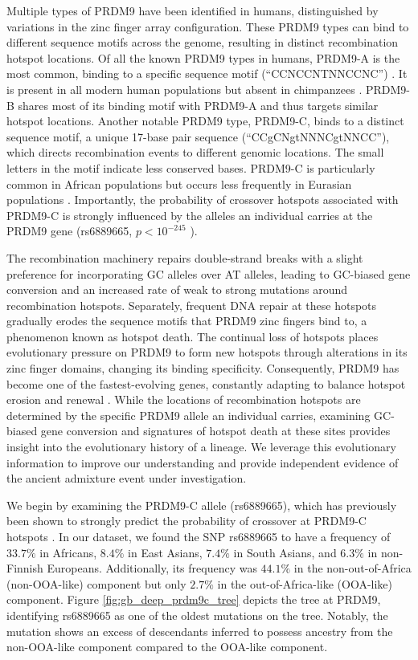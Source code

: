 Multiple types of PRDM9 have been identified in humans, distinguished by variations in the zinc finger array configuration. These PRDM9 types can bind to different sequence motifs across the genome, resulting in distinct recombination hotspot locations. Of all the known PRDM9 types in humans, PRDM9-A is the most common, binding to a specific sequence motif (``CCNCCNTNNCCNC'') \cite{coop2008high,myers2008common}. It is present in all modern human populations but absent in chimpanzees \cite{myers2010drive}. PRDM9-B shares most of its binding motif with PRDM9-A and thus targets similar hotspot locations. Another notable PRDM9 type, PRDM9-C, binds to a distinct sequence motif, a unique 17-base pair sequence (``CCgCNgtNNNCgtNNCC''), which directs recombination events to different genomic locations. The small letters in the motif indicate less conserved bases. PRDM9-C is particularly common in African populations but occurs less frequently in Eurasian populations \cite{hinch2011landscape,wegmann2011recombination,alleva2021cataloging}. Importantly, the probability of crossover hotspots associated with PRDM9-C is strongly influenced by the alleles an individual carries at the PRDM9 gene (rs6889665, $p<10^{-245}$ \cite{hinch2011landscape}). 

The recombination machinery repairs double-strand breaks with a slight preference for incorporating GC alleles over AT alleles, leading to GC-biased gene conversion and an increased rate of weak to strong mutations around recombination hotspots. Separately, frequent DNA repair at these hotspots gradually erodes the sequence motifs that PRDM9 zinc fingers bind to, a phenomenon known as hotspot death. The continual loss of hotspots places evolutionary pressure on PRDM9 to form new hotspots through alterations in its zinc finger domains, changing its binding specificity. Consequently, PRDM9 has become one of the fastest-evolving genes, constantly adapting to balance hotspot erosion and renewal \cite{myers2010drive,baker2017repeated}. While the locations of recombination hotspots are determined by the specific PRDM9 allele an individual carries, examining GC-biased gene conversion and signatures of hotspot death at these sites provides insight into the evolutionary history of a lineage. We leverage this evolutionary information to improve our understanding and provide independent evidence of the ancient admixture event under investigation.

We begin by examining the PRDM9-C allele (rs6889665), which has previously been shown to strongly predict the probability of crossover at PRDM9-C hotspots \cite{hinch2011landscape}. In our dataset, we found the SNP rs6889665 to have a frequency of $33.7\%$ in Africans, $8.4\%$ in East Asians, $7.4\%$ in South Asians, and $6.3\%$ in non-Finnish Europeans. Additionally, its frequency was $44.1\%$ in the non-out-of-Africa (non-OOA-like) component but only $2.7\%$ in the out-of-Africa-like (OOA-like) component. Figure \ref{fig:gb_deep_prdm9c_tree} depicts the tree at PRDM9, identifying rs6889665 as one of the oldest mutations on the tree. Notably, the mutation shows an excess of descendants inferred to possess ancestry from the non-OOA-like component compared to the OOA-like component.

